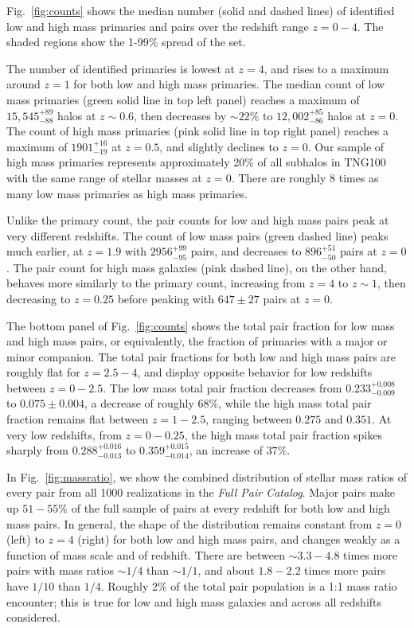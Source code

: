 \documentclass[twocolumn]{aastex631}
\newcommand{\paircat}{\textit{Full Pair Catalog}}
\begin{document}
    Fig.~\ref{fig:counts} shows the median number (solid and dashed lines) of identified low and high mass primaries and pairs over the redshift range $z=0-4$.   
    The shaded regions show the 1-99\% spread of the set. 

    The number of identified primaries is lowest at $z=4$, and rises to a maximum around $z=1$ for both low and high mass primaries.
    The median count of low mass primaries (green solid line in top left panel) reaches a maximum of $15,545^{+89}_{-88}$ halos at $z\sim0.6$, then decreases by $\sim22\%$ to $12,002^{+85}_{-86}$ halos at $z=0$. 
    The count of high mass primaries (pink solid line in top right panel) reaches a maximum of $1901^{+16}_{-19}$ at $z=0.5$, and slightly declines to $z=0$. 
    Our sample of high mass primaries represents approximately 20\% of all subhalos in TNG100 with the same range of stellar masses at $z=0$.
    There are roughly 8 times as many low mass primaries as high mass primaries. 

    Unlike the primary count, the pair counts for low and high mass pairs peak at very different redshifts. 
    The count of low mass pairs (green dashed line) peaks much earlier, at $z=1.9$ with $2956^{+99}_{-95}$ pairs, and decreases to $896^{+51}_{-50}$ pairs at $z=0$.
    The pair count for high mass galaxies (pink dashed line), on the other hand, behaves more similarly to the primary count, increasing from $z=4$ to $z\sim1$, then decreasing to $z=0.25$ before peaking with $647\pm27$ pairs at $z=0$. 

    The bottom panel of Fig.~\ref{fig:counts} shows the total pair fraction for low mass and high mass pairs, or equivalently, the fraction of primaries with a major or minor companion.
    The total pair fractions for both low and high mass pairs are roughly flat for $z=2.5-4$, and display opposite behavior for low redshifts between $z=0-2.5$. 
    The low mass total pair fraction decreases from $0.233^{+0.008}_{-0.009}$ to $0.075\pm 0.004$, a decrease of roughly $68\%$, while the high mass total pair fraction remains flat between $z=1-2.5$, ranging between $0.275$ and $0.351$.
    At very low redshifts, from $z=0-0.25$, the high mass total pair fraction spikes sharply from $0.288^{+0.016}_{-0.013}$ to $0.359^{+0.015}_{-0.014}$, an increase of $37\%$.

    In Fig.~\ref{fig:massratio}, we show the combined distribution of stellar mass ratios of every pair from all 1000 realizations in the \paircat.
    Major pairs make up $51-55\%$ of the full sample of pairs at every redshift for both low and high mass pairs.
    In general, the shape of the distribution remains constant from $z=0$ (left) to $z=4$ (right) for both low and high mass pairs, and changes weakly as a function of mass scale and of redshift. 
    There are between $\sim3.3-4.8$ times more pairs with mass ratios $\sim1/4$ than $\sim1/1$, and about $1.8-2.2$ times more pairs have $1/10$ than $1/4$. 
    Roughly 2\% of the total pair population is a 1:1 mass ratio encounter; this is true for low and high mass galaxies and across all redshifts considered.  
\end{document}
